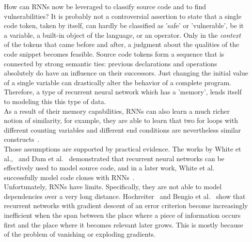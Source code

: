 \documentclass[
a4paper,
pagesize,
pdftex,
12pt,
ngerman,
fleqn,
final,
]{scrartcl}
\begin{document}
	How can RNNs now be leveraged to classify source code and to find vulnerabilities? It is probably not a controversial assertion to state that a single code token, taken by itself, can hardly be classified as 'safe' or 'vulnerable', be it a variable, a built-in object of the language, or an operator. Only in the \textit{context} of the tokens that came before and after, a judgment about the qualities of the code snippet becomes feasible. Source code tokens form a sequence that is connected by strong semantic ties: previous declarations and operations absolutely do have an influence on their successors. Just changing the initial value of a single variable can drastically alter the behavior of a complete program. Therefore, a type of recurrent neural network which has a 'memory', lends itself to modeling this this type of data.\\
	As a result of their memory capabilities, RNNs can also learn a much richer notion of similarity, for example, they are able to learn that two for loops with different counting variables and different end conditions are nevertheless similar constructs~\cite{Allamanis.2018}. \\
	Those assumptions are supported by practical evidence. The works by White et al.,~\cite{White.2015} and Dam et al.~\cite{Dam.2016b,Dam.2016} demonstrated that recurrent neural networks can be effectively used to model source code, and in a later work, White et al. successfully model code clones with RNNs~\cite{White.2016}.\\
	Unfortunately, RNNs have limits. Specifically, they are not able to model dependencies over a very long distance. Hochreiter~\cite{Hochreiter.1991} and Bengio et al.~\cite{Bengio.1994} show that recurrent networks with gradient descent of an error criterion become increasingly inefficient when the span between the place where a piece of information occurs first and the place where it becomes relevant later grows. This is mostly because of the problem of vanishing or exploding gradients.\\
	
\end{document}
